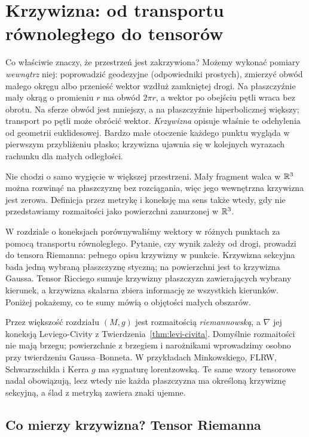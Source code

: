 \chapter{Krzywizna: od transportu równoległego do tensorów}
\label{ch:krzywizna}

Co właściwie znaczy, że przestrzeń jest zakrzywiona?
Możemy wykonać pomiary \emph{wewnątrz} niej: poprowadzić
geodezyjne (odpowiedniki prostych), zmierzyć obwód małego
okręgu albo przenieść wektor wzdłuż zamkniętej drogi.
Na płaszczyźnie mały okrąg o promieniu $r$ ma obwód
$2\pi r$, a wektor po obejściu pętli wraca bez obrotu.
Na sferze obwód jest mniejszy, a na płaszczyźnie
hiperbolicznej większy; transport po pętli może obrócić
wektor. \emph{Krzywizna} opisuje właśnie te odchylenia
od geometrii euklidesowej. Bardzo małe otoczenie
każdego punktu wygląda w pierwszym przybliżeniu
płasko; krzywizna ujawnia się w kolejnych wyrazach
rachunku dla małych odległości.

Nie chodzi o samo wygięcie w większej przestrzeni.
Mały fragment walca w $\mathbb{R}^3$ można rozwinąć na płaszczyznę
bez rozciągania, więc jego wewnętrzna krzywizna jest
zerowa. Definicja przez metrykę i koneksję ma sens
także wtedy, gdy nie przedstawiamy rozmaitości jako
powierzchni zanurzonej w $\mathbb{R}^3$.

W rozdziale o koneksjach porównywaliśmy wektory w różnych
punktach za pomocą transportu równoległego. Pytanie,
czy wynik zależy od drogi, prowadzi do tensora Riemanna:
pełnego opisu krzywizny w punkcie. Krzywizna sekcyjna
bada jedną wybraną płaszczyznę styczną; na powierzchni
jest to krzywizna Gaussa. Tensor Ricciego sumuje
krzywizny płaszczyzn zawierających wybrany kierunek,
a krzywizna skalarna zbiera informację ze wszystkich
kierunków. Poniżej pokażemy, co te sumy mówią o
objętości małych obszarów.

Przez większość rozdziału $(M,g)$ jest rozmaitością
\emph{riemannowską}, a $\nabla$ jej koneksją Leviego-Civity
z Twierdzenia~\ref{thm:levi-civita}. Domyślnie rozmaitości
nie mają brzegu; powierzchnie z brzegiem i narożnikami
wprowadzimy osobno przy twierdzeniu Gaussa--Bonneta. W przykładach
Minkowskiego, FLRW, Schwarzschilda i Kerra
$g$ ma sygnaturę lorentzowską.
Te same wzory tensorowe nadal obowiązują, lecz wtedy
nie każda płaszczyzna ma określoną krzywiznę sekcyjną,
a ślad z metryką zawiera znaki ujemne.

\section{Co mierzy krzywizna? Tensor Riemanna}

